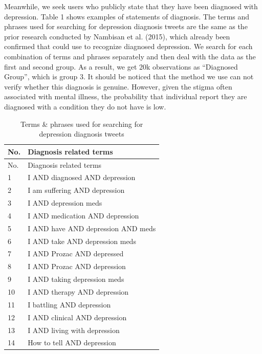 \documentclass[]{article}
\newenvironment{Shaded}{\begin{snugshade}}{\end{snugshade}}
\newcommand{\DataTypeTok}[1]{\textcolor[rgb]{0.13,0.29,0.53}{#1}}
\newcommand{\DecValTok}[1]{\textcolor[rgb]{0.00,0.00,0.81}{#1}}
\newcommand{\KeywordTok}[1]{\textcolor[rgb]{0.13,0.29,0.53}{\textbf{#1}}}
\newcommand{\NormalTok}[1]{#1}
\newcommand{\OperatorTok}[1]{\textcolor[rgb]{0.81,0.36,0.00}{\textbf{#1}}}
\newcommand{\OtherTok}[1]{\textcolor[rgb]{0.56,0.35,0.01}{#1}}
\newcommand{\StringTok}[1]{\textcolor[rgb]{0.31,0.60,0.02}{#1}}
\begin{document}
\begin{Shaded}
\end{Shaded}

Meanwhile, we seek users who publicly state that they have been
diagnosed with depression. Table 1 shows examples of statements of
diagnosis. The terms and phrases used for searching for depression
diagnosis tweets are the same as the prior research conducted by
Nambisan et al. (2015), which already been confirmed that could use to
recognize diagnosed depression. We search for each combination of terms
and phrases separately and then deal with the data as the first and
second group. As a result, we get 20k observations as ``Diagnosed
Group'', which is group 3. It should be noticed that the method we use
can not verify whether this diagnosis is genuine. However, given the
stigma often associated with mental illness, the probability that
individual report they are diagnosed with a condition they do not have
is low.

\begin{longtable}[]{@{}ll@{}}
\caption{Terms \& phrases used for searching for depression diagnosis
tweets}\tabularnewline
\toprule
No. & Diagnosis related terms\tabularnewline
\midrule
\endfirsthead
\toprule
No. & Diagnosis related terms\tabularnewline
\midrule
\endhead
1 & I AND diagnosed AND depression\tabularnewline
2 & I am suffering AND depression\tabularnewline
3 & I AND depression meds\tabularnewline
4 & I AND medication AND depression\tabularnewline
5 & I AND have AND depression AND meds\tabularnewline
6 & I AND take AND depression meds\tabularnewline
7 & I AND Prozac AND depressed\tabularnewline
8 & I AND Prozac AND depression\tabularnewline
9 & I AND taking depression meds\tabularnewline
10 & I AND therapy AND depression\tabularnewline
11 & I battling AND depression\tabularnewline
12 & I AND clinical AND depression\tabularnewline
13 & I AND living with depression\tabularnewline
14 & How to tell AND depression\tabularnewline
\bottomrule
\end{longtable}
\end{document}
